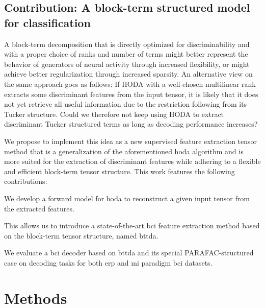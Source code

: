\documentclass[10pt]{iopart}
\begin{document}
\subsection{Contribution: A block-term structured model for classification}

A block-term decomposition that is directly optimized for discriminability and with a
proper choice of ranks and number of terms might better represent the behavior
of generators of neural activity through increased flexibility, or might
achieve better regularization through increased sparsity.
An alternative view on the same approach goes as follows:
If HODA with a well-chosen multilinear rank extracts some discriminant features
from the input tensor, it is likely that it does not yet retrieve all useful
information due to the restriction following from its Tucker structure.
Could we therefore not keep using HODA to extract discriminant Tucker structured
terms as long as decoding performance increases?

We propose to implement this idea as a new supervised feature
extraction tensor method that is a generalization of the aforementioned
\ac{hoda}
algorithm and is more suited for the extraction of discriminant
features while adhering to a flexible and efficient block-term tensor
structure.
This work features the following contributions:
\begin{enumerate*}[label={\arabic*)}]
  \item  We develop a forward model for \ac{hoda} to reconstruct a
	      given input tensor from the extracted features.
      \item This allows us to introduce a state-of-the-art \ac{bci} feature extraction
        method based on the block-term tensor structure, named \acf{bttda}.
      \item We evaluate a \ac{bci} decoder based on \ac{bttda} and its special
        PARAFAC-structured case on decoding tasks for both \ac{erp} and \ac{mi}
        paradigm \ac{bci} datasets.
\end{enumerate*}


\section{Methods}
\end{document}
